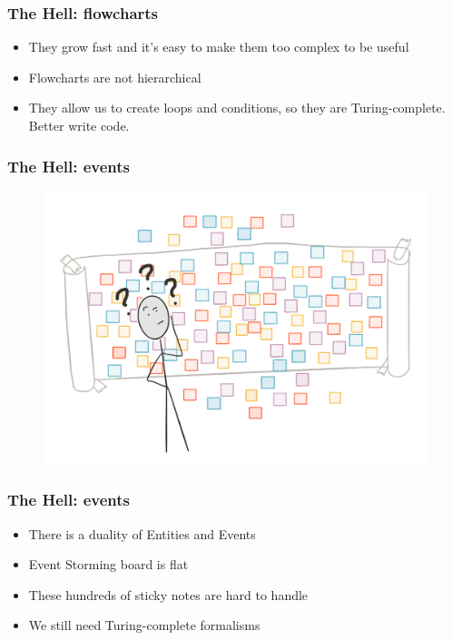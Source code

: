 \documentclass{beamer}
\begin{document}
\begin{frame}
    \frametitle{The Hell: flowcharts}
    
    \begin{itemize}
        \item They grow fast and it's easy to make them too complex to be useful
        \item Flowcharts are not hierarchical 
        \item They allow us to create loops and conditions, so they are Turing-complete. Better write code.
    \end{itemize}
\end{frame}

\begin{frame}
    \frametitle{The Hell: events}
    
    \begin{figure}
        \includegraphics[width=\textwidth]{media/eventstorming}
    \end{figure}
    
\end{frame}

\begin{frame}
    \frametitle{The Hell: events}
    
    \begin{itemize}
        \item There is a duality of Entities and Events
        \item Event Storming board is flat
        \item These hundreds of sticky notes are hard to handle
        \item We still need Turing-complete formalisms
    \end{itemize}
\end{frame}
\end{document}
